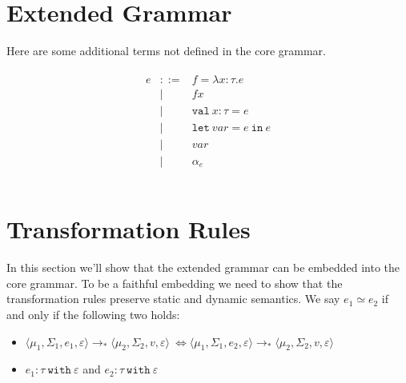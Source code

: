 \documentclass{llncs}
\newcommand{\keywadj}[1]{\mathtt{#1}}
\newcommand{\keyw}[1]{\keywadj{#1}~}
\newcommand{\config}[1] { \langle #1 \rangle }
\begin{document}
\section{Extended Grammar}

Here are some additional terms not defined in the core grammar.

\[
\begin{array}{lll}
\begin{array}{lllr}

	e & ::= & f = \lambda x : \tau . e\\
  		& | & f x\\
  		& | & \keyw{val} x : \tau = e\\
  		& | & \keyw{let} var = e~\keyw{in} e\\
  		& | & var\\
  		& | & \alpha_e\\
		&&\\
\end{array}
\end{array}
\]



\section{Transformation Rules}

In this section we'll show that the extended grammar can be embedded into the core grammar. To be a faithful embedding we need to show that the transformation rules preserve static and dynamic semantics. We say $e_1 \simeq e_2$ if and only if the following two holds:
\begin{itemize}
	\item $\config{\mu_1, \Sigma_1, e_1, \varepsilon} \longrightarrow_* \config{\mu_2, \Sigma_2, v, \varepsilon}\
			\iff
		    \config{\mu_1, \Sigma_1, e_2, \varepsilon} \longrightarrow_* \config{\mu_2, \Sigma_2, v, \varepsilon}$
	\item $e_1 : \tau~\keyw{with} \varepsilon$ and $e_2 : \tau~\keyw{with} \varepsilon$
\end{itemize}

\paragraph{}

\end{document}
